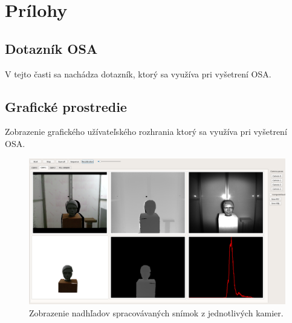 \hidefromtoc

\renewcommand \thechapter{\roman{chapter}}
\renewcommand \thesection{\roman{chapter}.\roman{section}}
\renewcommand \thesubsection{\roman{chapter}.\roman{section}.\roman{subsection}}

\renewcommand{\thefigure}{\roman{chapter}.\roman{figure}}
\renewcommand{\thetable}{\roman{chapter}.\roman{table}}


\chapter{Prílohy}

\section{Dotazník OSA} \label{sec:Priloha:Dot}
V tejto časti sa nachádza dotazník, ktorý sa využíva pri vyšetrení OSA.



\newpage
\section{Grafické prostredie} \label{sec:Priloha:HMI}
Zobrazenie grafického užívateľského rozhrania ktorý sa využíva pri vyšetrení OSA.

\begin{figure}[H]
	\centering
	\includegraphics[width=\textwidth]{figures/hmi.png}
	\caption{Zobrazenie nadhľadov spracovávaných snímok z jednotlivých kamier.}
	\label{fig:hmi:a}
\end{figure}

